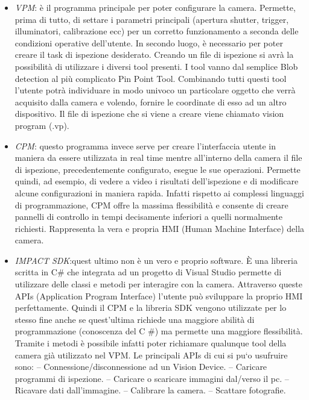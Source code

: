 \documentclass[12pt, a4paper, oneside]{book}
\begin{document}
\begin{itemize}
	\item \textit{VPM}: è il programma principale per poter configurare la camera. Permette, prima
	di tutto, di settare i parametri principali (apertura shutter, trigger, illuminatori,
	calibrazione ecc) per un corretto funzionamento a seconda delle condizioni operative
	dell'utente. In secondo luogo, è necessario per poter creare il task di ispezione
	desiderato. Creando un file di ispezione si avrà la possibilità di utilizzare i diversi
	tool presenti. I tool vanno dal semplice Blob detection al più complicato Pin Point
	Tool. Combinando tutti questi tool l'utente potrà individuare in modo univoco un
	particolare oggetto che verrà acquisito dalla camera e volendo, fornire le coordinate
	di esso ad un altro dispositivo. Il file di ispezione che si viene a creare viene
	chiamato vision program (.vp).
	\item \textit{CPM}: questo programma invece serve per creare l'interfaccia utente in maniera da essere utilizzata in real time mentre all'interno della camera il file di ispezione, precedentemente configurato, esegue le sue operazioni. Permette quindi, ad esempio,
	di vedere a video i risultati dell'ispezione e di modificare alcune configurazioni in
	maniera rapida. Infatti rispetto ai complessi linguaggi di programmazione, CPM
	offre la massima flessibilità e consente di creare pannelli di controllo in tempi decisamente
	inferiori a quelli normalmente richiesti. Rappresenta la vera e propria
	HMI (Human Machine Interface) della camera.
	\item \textit{IMPACT SDK}:quest ultimo non è un vero e proprio software. È una libreria scritta in C\# che integrata ad un progetto di Visual Studio permette di utilizzare delle classi e metodi per interagire con la camera. Attraverso queste APIs (Application Program Interface) l'utente può sviluppare la proprio HMI perfettamente. Quindi il CPM e la libreria SDK vengono utilizzate per lo
	stesso fine anche se quest'ultima richiede una maggiore abilità di programmazione (conoscenza del C \#) ma permette una maggiore flessibilità. Tramite i metodi è possibile infatti poter richiamare qualunque tool della camera già utilizzato nel VPM. Le principali APIs di cui si pu`o usufruire sono:
	– Connessione/disconnessione ad un Vision Device.
	– Caricare programmi di ispezione.
	– Caricare o scaricare immagini dal/verso il pc.
	– Ricavare dati dall'immagine.
	– Calibrare la camera.
	– Scattare fotografie.
\end{itemize}
\end{document}
